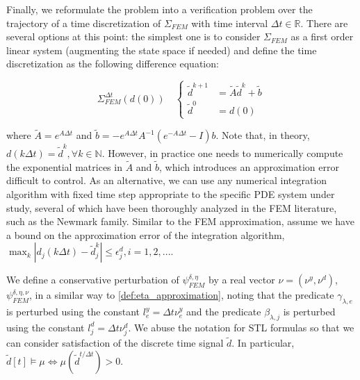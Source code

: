 \documentclass[oribibl]{llncs/llncs}
\newcommand*{\R}{\mathbb{R}}
\newcommand*{\N}{\mathbb{N}}
\newcommand{\Always}{\mathbf{G}}
\begin{document}
Finally, we reformulate the problem into a verification problem over the
trajectory of a time discretization of $\Sigma_{FEM}$ with time interval $\Delta
t \in \R$. There are several options at this point: the simplest one is to
consider $\Sigma_{FEM}$ as a first order linear system (augmenting the state
space if needed) and define the time discretization as the following difference
equation:

\begin{equation}
    \label{eq:disc_system}
    \Sigma_{FEM}^{\Delta t}(d(0)) \quad \left\{
    \begin{aligned}
        \tilde d^{k+1} &= \tilde A \tilde d^k + \tilde b \\
        \tilde d^0 &= d(0)
    \end{aligned}
    \right.
\end{equation}

where $\tilde A = e^{A \Delta t}$ and $\tilde b = - e^{A \Delta t} A^{-1} \left
( e^{- A \Delta t} - I \right ) b$. Note that, in theory, $d(k \Delta t) = \tilde d^k,
\forall k \in \N$. However, in practice one needs to numerically compute the
exponential matrices in $\tilde A$ and $\tilde b$, which introduces an
approximation error difficult to control. As an alternative, we can use any
numerical integration algorithm with fixed time step appropriate to the specific
PDE system under study, several of which have been
thoroughly analyzed in the FEM literature, such as the Newmark family. Similar
to the FEM approximation, assume we have a bound on the approximation error of
the integration algorithm, $\max_k |d_j(k \Delta t) - \tilde d^k_j| \leq
\epsilon^d_j, i=1,2,...$.

We define a conservative perturbation of $\psi^{\delta, \eta}_{FEM}$ by a real
vector $\nu = (\nu^y, \nu^d)$, $\psi^{\delta, \eta, \nu}_{FEM}$, in a similar
way to \cref{def:eta_approximation}, noting that the predicate $\gamma_{\lambda, e}$ is perturbed
using the constant $l_e^y = \Delta t \nu^y_e$ and the predicate $\beta_{\lambda, j}$ is
perturbed using the constant $l_j^d = \Delta t \nu^d_j$. We abuse the notation
for STL formulas so that we can consider satisfaction of the discrete time
signal $\tilde{d}$. In particular, $\tilde{d}[t] \models \mu \iff
\mu(\tilde{d}^{t / \Delta t}) > 0$.
\end{document}
